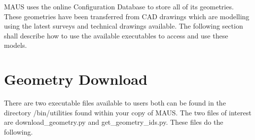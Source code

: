 MAUS uses the online Configuration Database to store all of its geometries. These geometries have been transferred from CAD drawings which are
modelling using the latest surveys and technical drawings available. The following section shall describe how to use the available executables to
access and use these models. 

\section{Geometry Download}

There are two executable files available to users both can be found in the directory /bin/utilities found within your copy of MAUS. The two files of
interest are download\_geometry.py and get\_geometry\_ids.py. These files do the following.

